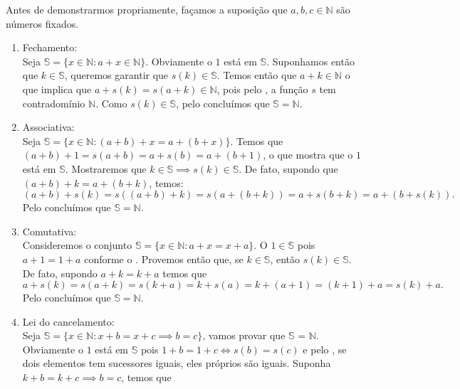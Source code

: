 \documentclass[../main.tex]{subfiles}
\begin{document}
\begin{dem}
    Antes de demonstrarmos propriamente, façamos a suposição que $a,b,c \in \mathbb{N}$ são números fixados.
    \begin{enumerate}[label=(\roman*)]    
        \item Fechamento: \\
            Seja $\mathbb{S} = \{ x \in \mathbb{N} : a + x \in \mathbb{N} \}$. Obviamente o $1$ está em $\mathbb{S}$. Suponhamos então que $k \in \mathbb{S}$, queremos  garantir que $s(k) \in \mathbb{S}$. Temos então que $a + k \in \mathbb{N}$ o que implica que $a + s(k) = s(a + k) \in \mathbb{N}$, pois pelo , a função $s$ tem contradomínio $\mathbb{N}$. Como $s(k) \in \mathbb{S}$, pelo  concluímos que $\mathbb{S} = \mathbb{N}$.
        \item Associativa: \\
             Seja $\mathbb{S} = \{ x \in \mathbb{N} : (a + b) + x = a + (b + x) \}$. Temos que \\
             $(a + b) + 1 = s(a + b) = a + s(b) = a + (b + 1)$, o que mostra que o $1$ está em $\mathbb{S}$. 
             Mostraremos que $k \in \mathbb{S} \implies s(k) \in \mathbb{S}$. De fato, supondo que $(a+b)+k = a+(b+k)$, temos:
             \[ (a + b) + s(k) = s( (a + b) + k) = s(a + (b + k)) = a + s(b + k) = a + (b + s(k)). \] 
             Pelo  concluímos que $\mathbb{S} = \mathbb{N}$.
        \item Comutativa: \\
            Consideremos o conjunto $\mathbb{S} = \{ x \in \mathbb{N} : a + x = x + a\}$. O $1 \in \mathbb{S}$ pois 
            $a + 1 = 1 + a$ conforme o .
            Provemos então que, se $k \in \mathbb{S}$, então $s(k) \in \mathbb{S}$. De fato, supondo $a+k = k+a$ temos que 
            \[ a + s(k) = s(a + k) = s(k + a) = k + s(a) = k + (a + 1) = (k + 1) + a = s(k) + a. \]
            Pelo  concluímos que $\mathbb{S} = \mathbb{N}$.
        \item Lei do cancelamento:  \\
            Seja $\mathbb{S} = \{ x \in \mathbb{N} : x + b = x + c \implies b = c \}$, vamos provar que $\mathbb{S}$ = $\mathbb{N}$. Obviamente o $1$ está em $\mathbb{S}$ pois $1 + b = 1 + c \iff s(b) = s(c)$ e pelo , se dois elementos tem sucessores iguais, eles próprios são iguais. Suponha $k + b = k + c \implies b = c$, temos que

\end{enumerate}
\end{dem}
\end{document}
